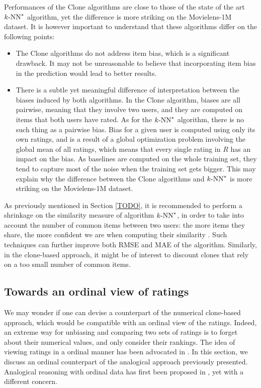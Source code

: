 Performances of the Clone algorithms are close to those of the state of the
art $k\text{-NN}^*$ algorithm, yet the difference is more striking on the Movielens-1M
dataset. It is however important to understand that these algorithms differ on
the following points:
\begin{itemize}
\item The Clone algorithms do not address item bias, which is a significant
  drawback. It may not be unreasonable to believe that incorporating item bias
  in the prediction would lead to better results.
\item There is a subtle yet meaningful difference of interpretation between the
  biases induced by both algorithms. In the Clone algorithm, biases are all
  pairwise, meaning that they involve two users, and they are computed on items
  that both users have rated. As for the $k\text{-NN}^*$ algorithm, there is no such
  thing as a pairwise bias. Bias for a given user is computed using only its
  own ratings, and is a result of a global optimization problem involving the
  global mean of all ratings, which means that every single rating in $R$ has
  an impact on the bias. As baselines are computed on the whole training set,
    they tend to capture most of the noise when the training set gets bigger.
    This may explain why the difference between the Clone algorithms and
    $k\text{-NN}^*$ is more striking on the Movielens-1M dataset.
\end{itemize}

As previously mentioned in Section \ref{TODO}, it is recommended to perform a
shrinkage on the similarity measure of algorithm $k\text{-NN}^*$, in order to take into
account the number of common items between two users: the more items they
share, the more confident we are when computing their similarity
\cite{KorACM2010}. Such techniques can further improve both RMSE and MAE of the
algorithm.  Similarly, in the clone-based approach, it might be of interest to
discount clones that rely on a too small number of common items.

\subsection{Towards an ordinal view of ratings}
\label{ORDINAL_POV}

We may wonder if one can devise a counterpart of the numerical clone-based
approach, which would be compatible with an ordinal view of the ratings.
Indeed, an extreme way for unbiasing and comparing two sets of ratings is to
forget about their numerical values, and only consider their rankings.  The
idea of viewing ratings in a ordinal manner has been advocated in
\cite{KorSillRECSYS11}.
In this section, we discuss an ordinal counterpart of the analogical approach
previously presented.  Analogical reasoning with ordinal data has first been
proposed in \cite{MicBarCAP09}, yet with a different concern.

